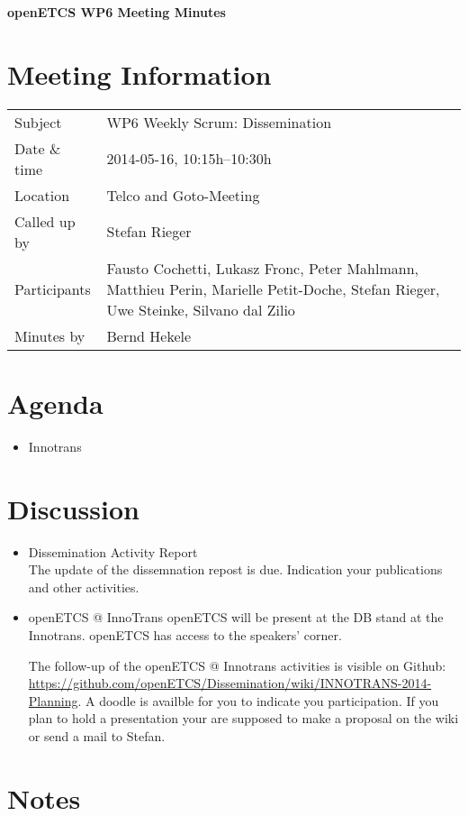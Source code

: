 \documentclass[a4paper, 11pt]{article}
\begin{document}
{\begin{center}\huge\bf openETCS WP6 Meeting Minutes\end{center}}
\section{Meeting Information}

\renewcommand{\arraystretch}{1.5}
\begin{supertabular}{m{.2\textwidth}m{.8\textwidth}}
Subject & WP6 Weekly Scrum: Dissemination\\
Date \& time & 2014-05-16, 10:15h--10:30h\\
Location & Telco and Goto-Meeting\\
Called up by & Stefan Rieger\\
Participants &
Fausto Cochetti,
Lukasz Fronc,
Peter Mahlmann,
Matthieu Perin,
Marielle Petit-Doche,
Stefan Rieger,
Uwe Steinke,
Silvano dal Zilio
\\

Minutes by & Bernd Hekele\\

\end{supertabular}
\renewcommand{\arraystretch}{1.0}


\section{Agenda}
\begin{itemize}

\item Innotrans

\end{itemize}

\section{Discussion}

\begin{itemize}
\item Dissemination Activity Report\\
The update of the dissemnation repost is due. Indication your publications and other activities.
 
\item openETCS @ InnoTrans
openETCS will be present at the DB stand at the Innotrans. openETCS has access to the speakers' corner.

The follow-up of the openETCS @ Innotrans activities is visible on Github:
\url{https://github.com/openETCS/Dissemination/wiki/INNOTRANS-2014-Planning}. A doodle is availble for you to indicate you participation. If you plan to hold a presentation your are supposed to make a proposal on the wiki or send a mail to Stefan.

\end{itemize}

\section{Notes}
\end{document}

